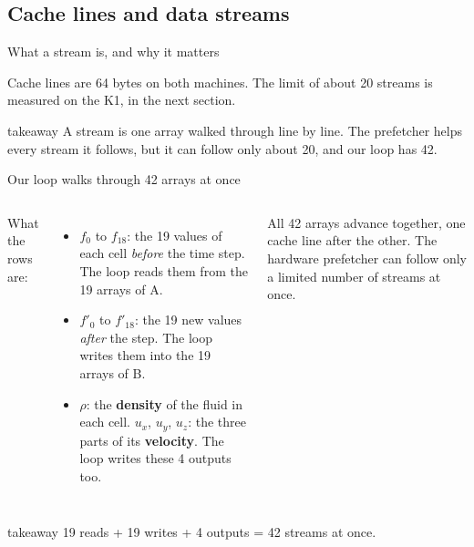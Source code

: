 \documentclass[aspectratio=169,10pt,t]{beamer}
\newcommand{\term}[1]{\textcolor{psblue!85!black}{\textbf{#1}}} %
\newcommand{\takeaway}[1]{\par\vfill
  \begin{beamercolorbox}[wd=\textwidth,sep=4pt,rounded=true]{takeaway}
    \small #1
  \end{beamercolorbox}}
\begin{document}
\subsection{Cache lines and data streams}
\begin{frame}{What a stream is, and why it matters}
  \vspace{2mm}
  \centering

  \vspace{1mm}
  \raggedright
  {\scriptsize\color{psgray}Cache lines are 64 bytes on both machines. The limit of about 20 streams is measured on
  the K1, in the next section.\par}
  \takeaway{A stream is one array walked through line by line. The prefetcher helps every stream it follows, but
    it can follow only about 20, and our loop has 42.}
\end{frame}
\begin{frame}{Our loop walks through 42 arrays at once}
  \begin{columns}[T,onlytextwidth]
    \vspace{1mm}
    \centering
    \vspace{1mm}
    {\small What the rows are:\par}
    \vspace{1mm}
    \begin{itemize}\small
      \item $f_0$ to $f_{18}$: the 19 values of each cell \emph{before} the time step. The loop reads them from
            the 19 arrays of A.
      \item $f'_0$ to $f'_{18}$: the 19 new values \emph{after} the step. The loop writes them into the 19
            arrays of B.
      \item $\rho$: the \term{density} of the fluid in each cell. $u_x$, $u_y$, $u_z$: the three parts of its
            \term{velocity}. The loop writes these 4 outputs too.
    \end{itemize}
    \vspace{1mm}
    {\small All 42 arrays advance together, one cache line after the other. The hardware prefetcher can follow
    only a limited number of streams at once.\par}
  \end{columns}
  \takeaway{19 reads + 19 writes + 4 outputs = 42 streams at once.}
\end{frame}
\end{document}
